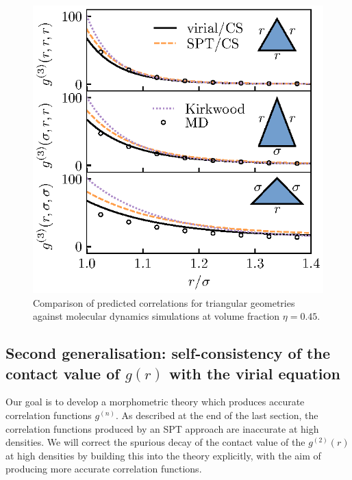 \documentclass[11pt,twoside]{report}
\begin{document}
\begin{figure}
  \includegraphics[width=0.9\linewidth,outer]{g3}
  \caption{Comparison of predicted correlations for triangular geometries against molecular dynamics simulations at volume fraction $\eta = 0.45$.}
  \label{fig:g3}
\end{figure}

\subsection{Second generalisation: self-consistency of the contact value of $g(r)$ with the virial equation}
\label{sec:virial-spt}

Our goal is to develop a morphometric theory which produces accurate correlation functions $g^{(n)}$.
As described at the end of the last section, the correlation functions produced by an SPT approach are inaccurate at high densities.
We will correct the spurious decay of the contact value of the $g^{(2)}(r)$ at high densities by building this into the theory explicitly, with the aim of producing more accurate correlation functions.

\end{document}
